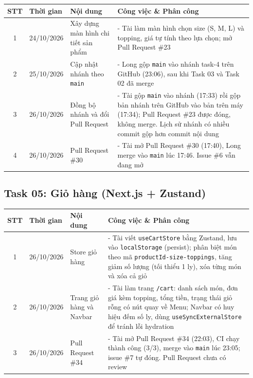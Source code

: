 \documentclass[12pt, a4paper]{article}
\begin{document}
\begin{tabularx}{\textwidth}{|c|p{3.2cm}|Y|Y|}
    \hline
    \textbf{STT} & \textbf{Thời gian} & \textbf{Nội dung} & \textbf{Công việc \& Phân công} \\
    \hline

    1 & 24/10/2026 & Xây dựng màn hình chi tiết sản phẩm &
    - Tài làm màn hình chọn size (S, M, L) và topping, giá tự tính theo lựa chọn; mở Pull Request \#23 \\
    \hline

    2 & 25/10/2026 & Cập nhật nhánh theo \texttt{main} &
    - Long gộp \texttt{main} vào nhánh task-4 trên GitHub (23:06), sau khi Task 03 và Task 02 đã merge \\
    \hline

    3 & 26/10/2026 & Đồng bộ nhánh và đổi Pull Request &
    - Tài gộp \texttt{main} vào nhánh (17:33) rồi gộp bản nhánh trên GitHub vào bản trên máy (17:34); Pull Request \#23 được đóng, không merge. Lịch sử nhánh có nhiều commit gộp hơn commit nội dung \\
    \hline

    4 & 26/10/2026 & Pull Request \#30 &
    - Tài mở Pull Request \#30 (17:40), Long merge vào \texttt{main} lúc 17:46. Issue \#6 vẫn đang mở \\
    \hline
\end{tabularx}

\vspace{0.8cm}

\subsection*{Task 05: Giỏ hàng (Next.js + Zustand)}

\begin{tabularx}{\textwidth}{|c|p{3.2cm}|Y|Y|}
    \hline
    \textbf{STT} & \textbf{Thời gian} & \textbf{Nội dung} & \textbf{Công việc \& Phân công} \\
    \hline

    1 & 26/10/2026 & Store giỏ hàng &
    - Tài viết \texttt{useCartStore} bằng Zustand, lưu vào \texttt{localStorage} (persist); phân biệt món theo mã \texttt{productId-size-toppings}, tăng giảm số lượng (tối thiểu 1 ly), xóa từng món và xóa cả giỏ \\
    \hline

    2 & 26/10/2026 & Trang giỏ hàng và Navbar &
    - Tài làm trang \texttt{/cart}: danh sách món, đơn giá kèm topping, tổng tiền, trạng thái giỏ rỗng có nút quay về Menu; Navbar có huy hiệu đếm số ly, dùng \texttt{useSyncExternalStore} để tránh lỗi hydration \\
    \hline

    3 & 26/10/2026 & Pull Request \#34 &
    - Tài mở Pull Request \#34 (22:03), CI chạy thành công (3/3), merge vào \texttt{main} lúc 23:05; issue \#7 tự đóng. Pull Request chưa có review \\
    \hline
\end{tabularx}
\end{document}
